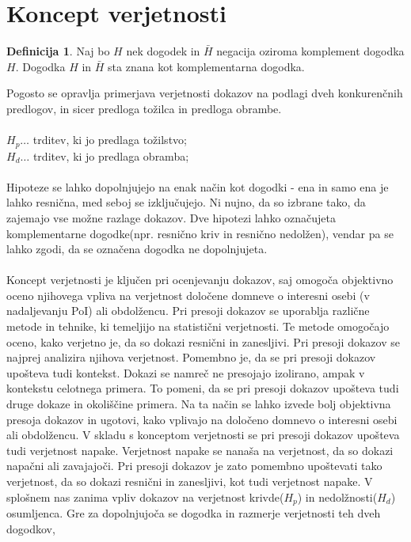 \documentclass[12pt,a4paper]{amsart}
\theoremstyle{definition} %
\newtheorem{definicija}{Definicija}[section]
\theoremstyle{plain} %
\begin{document}
\section{Koncept verjetnosti}
\begin{definicija}
    Naj bo $H$ nek dogodek in $\bar{H}$ negacija oziroma komplement dogodka $H$. Dogodka $H$ in $\bar{H}$ sta znana kot komplementarna dogodka.
\end{definicija}
Pogosto se opravlja primerjava verjetnosti dokazov na podlagi dveh konkurenčnih predlogov, in sicer predloga tožilca in predloga obrambe.\\\\
$H_p \dots$ trditev, ki jo predlaga tožilstvo;\\
$H_d \dots$ trditev, ki jo predlaga obramba;\\\\
Hipoteze se lahko dopolnjujejo na enak način kot dogodki - ena in samo ena je lahko resnična, med seboj se izključujejo. Ni nujno, da so izbrane 
tako, da zajemajo vse možne razlage dokazov. Dve hipotezi lahko označujeta komplementarne dogodke(npr. resnično kriv in resnično nedolžen), 
vendar pa se lahko zgodi, da se označena dogodka ne dopolnjujeta. \\\\
Koncept verjetnosti je ključen pri ocenjevanju dokazov, saj omogoča objektivno oceno njihovega vpliva na verjetnost določene domneve o interesni 
osebi (v nadaljevanju PoI) ali obdolžencu. Pri presoji dokazov se uporablja različne metode in tehnike, ki temeljijo na statistični verjetnosti. 
Te metode omogočajo oceno, kako verjetno je, da so dokazi resnični in zanesljivi. Pri presoji dokazov se najprej analizira njihova verjetnost. Pomembno je, 
da se pri presoji dokazov upošteva tudi kontekst. Dokazi se namreč ne presojajo izolirano, ampak v kontekstu celotnega primera. To pomeni, da se 
pri presoji dokazov upošteva tudi druge dokaze in okoliščine primera. Na ta način se lahko izvede bolj objektivna presoja dokazov in ugotovi, kako 
vplivajo na določeno domnevo o interesni osebi ali obdolžencu. V skladu s konceptom verjetnosti se pri presoji dokazov upošteva tudi verjetnost napake. 
Verjetnost napake se nanaša na verjetnost, da so dokazi napačni ali zavajajoči. Pri presoji dokazov je zato pomembno upoštevati tako verjetnost, da 
so dokazi resnični in zanesljivi, kot tudi verjetnost napake. V splošnem nas zanima vpliv dokazov na verjetnost krivde($H_p$) in
nedolžnosti($H_d$) osumljenca. Gre za dopolnjujoča se dogodka in razmerje verjetnosti teh dveh dogodkov,
\end{document}
